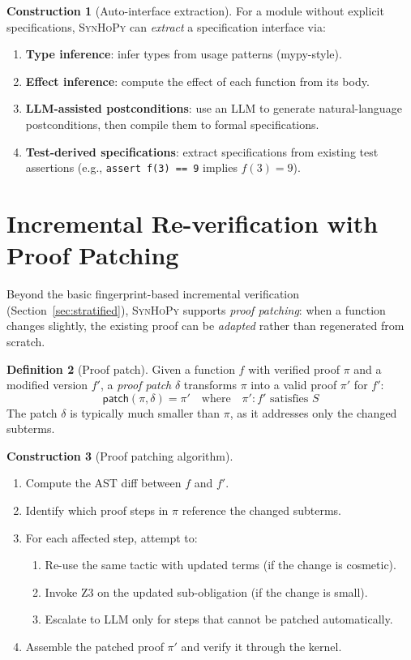 \documentclass[11pt,a4paper]{report}
\theoremstyle{definition}
\newtheorem{definition}{Definition}[chapter]
\newtheorem{construction}[definition]{Construction}
\theoremstyle{plain}
\newcommand{\synhopy}{\textsc{SynHoPy}}
\begin{document}
\begin{construction}[Auto-interface extraction]
For a module without explicit specifications, \synhopy{} can \emph{extract} a
specification interface via:
\begin{enumerate}
  \item \textbf{Type inference}: infer types from usage patterns (mypy-style).
  \item \textbf{Effect inference}: compute the effect of each function from its body.
  \item \textbf{LLM-assisted postconditions}: use an LLM to generate natural-language
    postconditions, then compile them to formal specifications.
  \item \textbf{Test-derived specifications}: extract specifications from existing
    test assertions (e.g., \lstinline[style=python]{assert f(3) == 9} implies
    $f(3) = 9$).
\end{enumerate}
\end{construction}


\section{Incremental Re-verification with Proof Patching}

Beyond the basic fingerprint-based incremental verification (Section~\ref{sec:stratified}),
\synhopy{} supports \emph{proof patching}: when a function changes slightly,
the existing proof can be \emph{adapted} rather than regenerated from scratch.

\begin{definition}[Proof patch]
Given a function $f$ with verified proof $\pi$ and a modified version $f'$,
a \emph{proof patch} $\delta$ transforms $\pi$ into a valid proof $\pi'$ for $f'$:
\[
  \mathsf{patch}(\pi, \delta) = \pi' \quad\text{where}\quad \pi' : f' \text{ satisfies } S
\]
The patch $\delta$ is typically much smaller than $\pi$, as it addresses only
the changed subterms.
\end{definition}

\begin{construction}[Proof patching algorithm]
\begin{enumerate}
  \item Compute the AST diff between $f$ and $f'$.
  \item Identify which proof steps in $\pi$ reference the changed subterms.
  \item For each affected step, attempt to:
    \begin{enumerate}
      \item Re-use the same tactic with updated terms (if the change is cosmetic).
      \item Invoke Z3 on the updated sub-obligation (if the change is small).
      \item Escalate to LLM only for steps that cannot be patched automatically.
    \end{enumerate}
  \item Assemble the patched proof $\pi'$ and verify it through the kernel.
\end{enumerate}
\end{construction}
\end{document}
